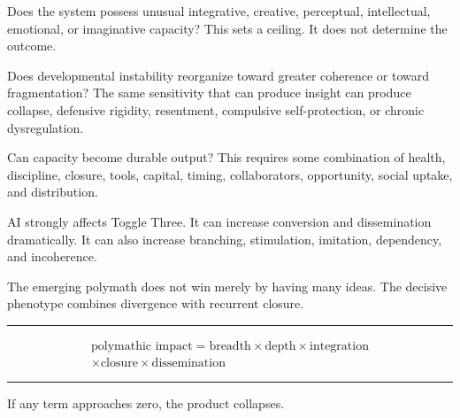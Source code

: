 \documentclass[10pt]{article}
\newcommand{\ActiveAccent}{Industrial}
\newcommand{\subhead}[1]{\Needspace{4\baselineskip}\vspace{0.5em}{\sffamily\bfseries\fontsize{10.5}{13}\selectfont\textcolor{\ActiveAccent}{#1}}\par\vspace{-0.1em}}
\newenvironment{equationpanel}{\begin{center}\begin{minipage}{0.92\linewidth}\color{\ActiveAccent}\rule{\linewidth}{0.55pt}\par\vspace{-0.25em}\color{Ink}}{\vspace{-0.10em}\par\color{\ActiveAccent}\rule{\linewidth}{0.55pt}\end{minipage}\end{center}}
\begin{document}
\subhead{Toggle One: Orchestration magnitude}

Does the system possess unusual integrative, creative, perceptual, intellectual, emotional, or imaginative capacity? This sets a ceiling. It does not determine the outcome.

\subhead{Toggle Two: Reorganization direction}

Does developmental instability reorganize toward greater coherence or toward fragmentation? The same sensitivity that can produce insight can produce collapse, defensive rigidity, resentment, compulsive self-protection, or chronic dysregulation.

\subhead{Toggle Three: Conversion and dissemination}

Can capacity become durable output? This requires some combination of health, discipline, closure, tools, capital, timing, collaborators, opportunity, social uptake, and distribution.

AI strongly affects Toggle Three. It can increase conversion and dissemination dramatically. It can also increase branching, stimulation, imitation, dependency, and incoherence.

The emerging polymath does not win merely by having many ideas. The decisive phenotype combines divergence with recurrent closure.

\begin{equationpanel}
\begin{equation*}
\begin{gathered}
\text{polymathic impact}=\text{breadth}\times\text{depth}\times\text{integration}\\
\times\text{closure}\times\text{dissemination}
\end{gathered}
\end{equation*}
\end{equationpanel}

If any term approaches zero, the product collapses.
\end{document}
